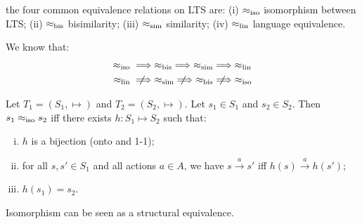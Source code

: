  
\begin{definition}[Equivalences]
    the four common equivalence relations on LTS are: 
    (i) $\approx_{\mathrm{iso}}$ isomorphism between LTS; 
    (ii) $\approx_{\mathrm{bis}}$ bisimilarity;
    (iii) $\approx_{\mathrm{sim}}$ similarity;
    (iv) $\approx_{\mathrm{lin}}$ language equivalence.
\end{definition}

\begin{theorem}
    We know that:
    \begin{align*}
        \equiso &\implies  \equbis \implies  \equsim \implies  \equlin \\
        \equlin &\notimplies  \equsim \notimplies  \equbis \notimplies  \equiso
    \end{align*}
\end{theorem}


\begin{definition}[Isomorphism]
Let $T_1 = (S_1,\mapsto)$ and $T_2 = (S_2,\mapsto)$. Let $s_1 \in S_1$ and $s_2 \in S_2$. Then $s_1 \approx_{\mathrm{iso}} s_2$ iff there exists $h: S_1 \mapsto S_2$ such that:
\begin{enumerate}[(i), noitemsep]
    \item $h$ is a bijection (onto and 1-1);
    \item for all $s,s' \in S_1$ and all actions $a \in A$, we have $s \xrightarrow{a} s'$ iff $h(s) \xrightarrow{a} h(s')$;
    \item $h(s_1) = s_2$.
\end{enumerate}
\end{definition}

\begin{remark}
    Isomorphism can be seen as a structural equivalence. 
\end{remark}


